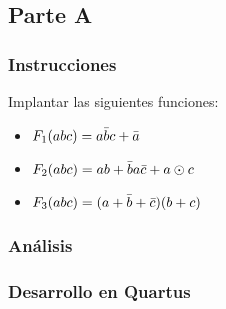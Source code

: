 \documentclass[../procedimientos.tex]{subfiles}
\begin{document}
\subsection{Parte A}
\subsubsection{Instrucciones}
Implantar las siguientes funciones:
\begin{itemize}
  \item $F_1 (abc) = a\bar{b}c + \bar{a}$
  \item $F_2 (abc) = ab + \bar{b}a\bar{c} + a \odot c$
  \item $F_3 (abc) = (a + \bar{b} + \bar{c}) (b + c)$
\end{itemize}

\subsubsection{Análisis}

\subsubsection{Desarrollo en Quartus}

\newpage
\end{document}
